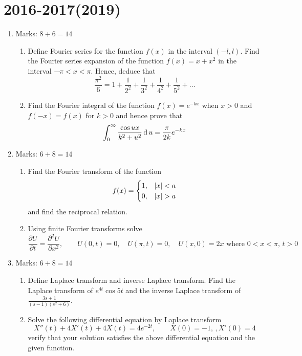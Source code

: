 \documentclass[../main-sheet.tex]{subfiles}
\begin{document}
\section*{2016-2017(2019)}
\begin{enumerate}
    \item Marks: $ 8+6=14 $
    \begin{enumerate}
        \item Define Fourier series for the function $ f(x) $ in the interval $ (-l,l) $. Find the Fourier series expansion of the function $ f(x)=x+x^2 $ in the interval $ -\pi<x<\pi $. Hence, deduce that 
        \[
            \frac{\pi^2}{6}=1+\frac{1}{2^2}+\frac{1}{3^2}+\frac{1}{4^2}+\frac{1}{5^2}+\dots
        \]
        \item Find the Fourier integral of the function $ f(x)=e^{-kx} $ when $ x>0 $ and $ f(-x)=f(x) $ for $ k>0 $ and hence prove that
        \[
            \int_0^\infty \frac{\cos ux}{k^2+u^2}\,\mathrm{d}\, u=\frac{\pi}{2k}e^{-kx}
        \]
    \end{enumerate}
    \item Marks: $ 6+8=14 $
    \begin{enumerate}
        \item Find the Fourier transform of the function
        \[
            f(x)=\begin{cases}
            1,&\left\vert x\right\vert<a\\
            0,&\left\vert x\right\vert>a
            \end{cases}
        \]
        and find the reciprocal relation.
        \item Using finite Fourier transforms solve
        \[
            \frac{\partial U}{\partial t}=\frac{\partial^2 U}{\partial x^2},\qquad U(0,t)=0,\quad U(\pi,t)=0,\quad U(x,0)=2x\text{ where }0<x<\pi,\,t>0
        \]
    \end{enumerate}
    \item Marks: $ 6+8=14 $
    \begin{enumerate}
        \item Define Laplace transform and inverse Laplace transform. Find the Laplace transform of $ e^{4t}\cos5t $ and the inverse Laplace transform of $ \frac{3s+1}{(s-1)(s^2+6)} $.
        \item Solve the following differential equation by Laplace transform
        \[
            X''(t)+4X'(t)+4X(t)=4e^{-2t},\qquad X(0)=-1,\,,X'(0)=4
        \]
        verify that your solution satisfies the above differential equation and the given function.
    \end{enumerate}

\end{enumerate}
\end{document}
